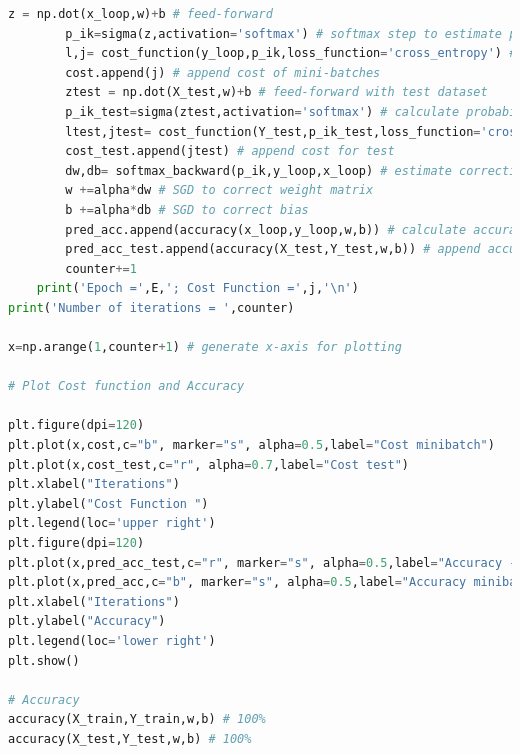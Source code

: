 \documentclass{article}
\begin{document}
\begin{lstlisting}[language=Python]
        z = np.dot(x_loop,w)+b # feed-forward
        p_ik=sigma(z,activation='softmax') # softmax step to estimate probabilities
        l,j= cost_function(y_loop,p_ik,loss_function='cross_entropy') # cost function
        cost.append(j) # append cost of mini-batches        
        ztest = np.dot(X_test,w)+b # feed-forward with test dataset
        p_ik_test=sigma(ztest,activation='softmax') # calculate probability
        ltest,jtest= cost_function(Y_test,p_ik_test,loss_function='cross_entropy') # calculate cost for prediction
        cost_test.append(jtest) # append cost for test
        dw,db= softmax_backward(p_ik,y_loop,x_loop) # estimate correction for the bias and weight
        w +=alpha*dw # SGD to correct weight matrix
        b +=alpha*db # SGD to correct bias
        pred_acc.append(accuracy(x_loop,y_loop,w,b)) # calculate accuracy for x_loop
        pred_acc_test.append(accuracy(X_test,Y_test,w,b)) # append accuracy for test
        counter+=1
    print('Epoch =',E,'; Cost Function =',j,'\n')
print('Number of iterations = ',counter)

x=np.arange(1,counter+1) # generate x-axis for plotting

# Plot Cost function and Accuracy

plt.figure(dpi=120)
plt.plot(x,cost,c="b", marker="s", alpha=0.5,label="Cost minibatch")
plt.plot(x,cost_test,c="r", alpha=0.7,label="Cost test")
plt.xlabel("Iterations")
plt.ylabel("Cost Function ")
plt.legend(loc='upper right')
plt.figure(dpi=120)
plt.plot(x,pred_acc_test,c="r", marker="s", alpha=0.5,label="Accuracy - Test")
plt.plot(x,pred_acc,c="b", marker="s", alpha=0.5,label="Accuracy minibatch Train")
plt.xlabel("Iterations")
plt.ylabel("Accuracy")
plt.legend(loc='lower right')
plt.show()

# Accuracy 
accuracy(X_train,Y_train,w,b) # 100%
accuracy(X_test,Y_test,w,b) # 100%
\end{lstlisting}
\end{document}

